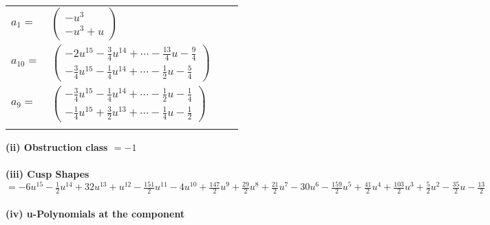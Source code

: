 \documentclass[1p]{elsarticle_modified}
\theoremstyle{definition}
\begin{document}
\begin{tabular}{m{7pt} m{180pt} m{7pt} m{180pt} }
\flushright $a_{1}=$&$\begin{pmatrix}- u^3\\- u^3+u\end{pmatrix}$ \\
\flushright $a_{10}=$&$\begin{pmatrix}-2 u^{15}-\frac{3}{4} u^{14}+\cdots-\frac{13}{4} u-\frac{9}{4}\\-\frac{3}{4} u^{15}-\frac{1}{4} u^{14}+\cdots-\frac{1}{2} u-\frac{5}{4}\end{pmatrix}$ \\
\flushright $a_{9}=$&$\begin{pmatrix}-\frac{3}{4} u^{15}-\frac{1}{4} u^{14}+\cdots-\frac{1}{2} u-\frac{1}{4}\\-\frac{1}{4} u^{15}+\frac{3}{2} u^{13}+\cdots-\frac{1}{4} u-\frac{1}{2}\end{pmatrix}$\\&\end{tabular}
\flushleft \textbf{(ii) Obstruction class $= -1$}\\~\\
\flushleft \textbf{(iii) Cusp Shapes $= -6 u^{15}-\frac{1}{2} u^{14}+32 u^{13}+u^{12}-\frac{151}{2} u^{11}-4 u^{10}+\frac{147}{2} u^9+\frac{29}{2} u^8+\frac{21}{2} u^7-30 u^6-\frac{159}{2} u^5+\frac{41}{2} u^4+\frac{103}{2} u^3+\frac{5}{2} u^2-\frac{35}{2} u-\frac{13}{2}$}\\~\\
\newpage\renewcommand{\arraystretch}{1}
\flushleft \textbf{(iv) u-Polynomials at the component}\newline \\
\end{document}
